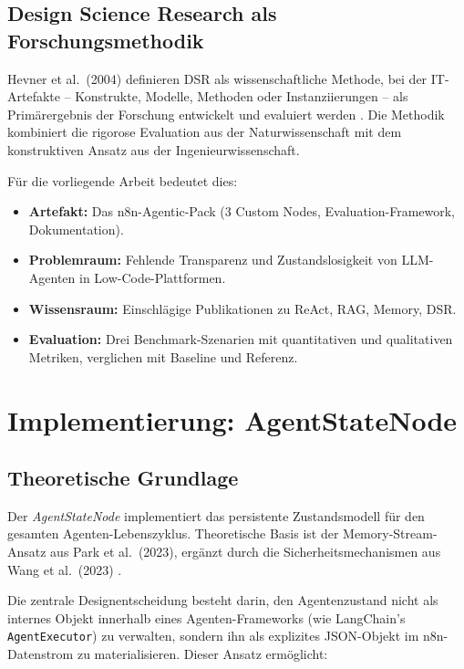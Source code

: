 \documentclass[12pt,a4paper,oneside]{report}
\begin{document}
\section{Design Science Research als Forschungsmethodik}
\label{sec:dsr}

Hevner et al.\ (2004) definieren \ac{DSR} als wissenschaftliche Methode, bei der
IT-Artefakte -- Konstrukte, Modelle, Methoden oder Instanziierungen -- als
Primärergebnis der Forschung entwickelt und evaluiert werden \cite{hevner2004design}.
Die Methodik kombiniert die rigorose Evaluation aus der Naturwissenschaft mit dem
konstruktiven Ansatz aus der Ingenieurwissenschaft.

Für die vorliegende Arbeit bedeutet dies:

\begin{itemize}
  \item \textbf{Artefakt:} Das n8n-Agentic-Pack (3 Custom Nodes, Evaluation-Framework,
    Dokumentation).
  \item \textbf{Problemraum:} Fehlende Transparenz und Zustandslosigkeit von LLM-Agenten
    in Low-Code-Plattformen.
  \item \textbf{Wissensraum:} Einschlägige Publikationen zu ReAct, RAG, Memory, DSR.
  \item \textbf{Evaluation:} Drei Benchmark-Szenarien mit quantitativen und qualitativen
    Metriken, verglichen mit Baseline und Referenz.
\end{itemize}

\chapter{Implementierung: AgentStateNode}

\section{Theoretische Grundlage}

Der \textit{AgentStateNode} implementiert das persistente Zustandsmodell für den
gesamten Agenten-Lebenszyklus. Theoretische Basis ist der Memory-Stream-Ansatz aus
Park et al.\ (2023), ergänzt durch die Sicherheitsmechanismen aus Wang et al.\ (2023)
\cite{park2023generative, wang2023survey}.

Die zentrale Designentscheidung besteht darin, den Agentenzustand nicht als internes
Objekt innerhalb eines Agenten-Frameworks (wie LangChain's \texttt{AgentExecutor}) zu
verwalten, sondern ihn als explizites \ac{JSON}-Objekt im n8n-Datenstrom zu
materialisieren. Dieser Ansatz ermöglicht:
\end{document}
